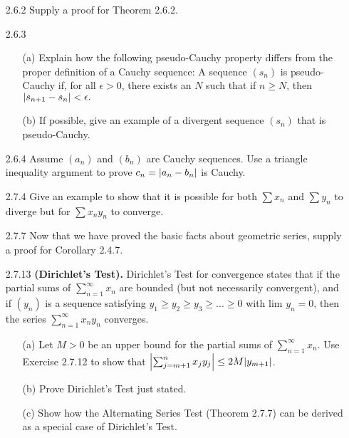 \documentclass[12pt,letterpaper]{article}
\begin{document}
\begin{itemize}[leftmargin=!,labelindent=5pt]
\begin{proof}
            First, choose $k=1$ and pick $a_{n_1}$ to add to the subsequence such that $a_{n_1} \in (s - \frac{1}{1}, s]$.

            Next, choose $k>1$ and pick $a_{n_k}$ to add to the subsequence such that $a_{n_k} \in (s - \frac{1}{k}, s]$.

            Repeating the 2nd step while always choosing $k$ such that it is strictly greater than the previous choice will yield in the desired subsequence.
            This is because it is guaranteed there are always infinitely many terms left to pick from the sequence and add to the subsequence by the way $S$ is defined.
            Thus, this method creates a subsequence of $(a_n)$ which converges to $s$ as the $\frac{1}{k}$ term becomes smaller, that is $\abs{s - a_{n_k}} < \frac{1}{k}$.

        \end{proof}
    \item [2.6.2] Supply a proof for Theorem 2.6.2.
    \item [2.6.3]
        \begin{itemize}
            \item [(a)] Explain how the following pseudo-Cauchy property differs from the proper definition of a Cauchy sequence: A sequence $(s_n)$ is pseudo-Cauchy if, for all $\epsilon > 0$, there exists an $N$ such that if $n \geq N$, then $\abs{s_{n+1} - s_n} < \epsilon.$
            \item [(b)] If possible, give an example of a divergent sequence $(s_n)$ that is pseudo-Cauchy.
        \end{itemize}
    \item [2.6.4] Assume $(a_n)$ and $(b_n)$ are Cauchy sequences. Use a triangle inequality argument to prove $c_n = \abs{a_n - b_n}$ is Cauchy.
    \item [2.7.4] Give an example to show that it is possible for both $\sum{x_n}$ and $\sum{y_n}$ to diverge but for $\sum{x_n y_n}$ to converge.
    \item [2.7.7] Now that we have proved the basic facts about geometric series, supply a proof for Corollary 2.4.7.
    \item [2.7.13] \textbf{(Dirichlet’s Test).} Dirichlet’s Test for convergence states that if the partial sums of $\sum_{n=1}^{\infty} x_n$ are bounded (but not necessarily convergent), and if $(y_n)$ is a sequence satisfying $y_1 \geq y_2 \geq y_3 \geq ... \geq 0$ with lim $y_n = 0$, then the series $\sum_{n=1}^{\infty} x_n y_n$ converges.
        \begin{itemize}
            \item [(a)] Let $M > 0$ be an upper bound for the partial sums of $\sum_{n=1}^{\infty}x_n$. Use Exercise 2.7.12 to show that $\abs{\sum_{j=m+1}^{n} x_j y_j} \leq 2M \abs{y_{m+1}}$.
            \item [(b)] Prove Dirichlet’s Test just stated.
            \item [(c)] Show how the Alternating Series Test (Theorem 2.7.7) can be derived as a special case of Dirichlet’s Test.
        \end{itemize}
\end{itemize}
\end{document}
